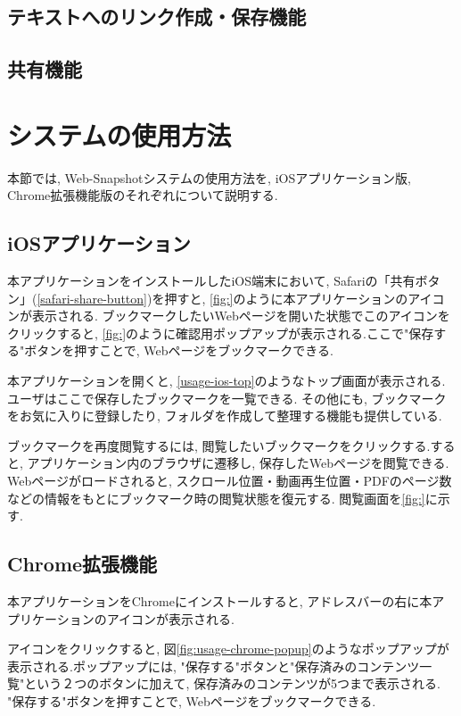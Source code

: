 \subsection{テキストへのリンク作成・保存機能}
\subsection{共有機能}

\section{システムの使用方法}
本節では, Web-Snapshotシステムの使用方法を, iOSアプリケーション版, Chrome拡張機能版のそれぞれについて説明する.

\subsection{iOSアプリケーション}
本アプリケーションをインストールしたiOS端末において, Safariの「共有ボタン」(\ref{safari-share-button})を押すと, \ref{fig:}のように本アプリケーションのアイコンが表示される.
ブックマークしたいWebページを開いた状態でこのアイコンをクリックすると, \ref{fig:}のように確認用ポップアップが表示される.ここで"保存する"ボタンを押すことで, Webページをブックマークできる.

本アプリケーションを開くと, \ref{usage-ios-top}のようなトップ画面が表示される.ユーザはここで保存したブックマークを一覧できる.
その他にも, ブックマークをお気に入りに登録したり, フォルダを作成して整理する機能も提供している.

ブックマークを再度閲覧するには, 閲覧したいブックマークをクリックする.すると, アプリケーション内のブラウザに遷移し, 保存したWebページを閲覧できる.
Webページがロードされると, スクロール位置・動画再生位置・PDFのページ数などの情報をもとにブックマーク時の閲覧状態を復元する.
閲覧画面を\ref{fig:}に示す.

\subsection{Chrome拡張機能}
本アプリケーションをChromeにインストールすると, アドレスバーの右に本アプリケーションのアイコンが表示される.

アイコンをクリックすると, 図\ref{fig:usage-chrome-popup}のようなポップアップが表示される.ポップアップには, "保存する"ボタンと"保存済みのコンテンツ一覧"という２つのボタンに加えて, 保存済みのコンテンツが5つまで表示される.
"保存する"ボタンを押すことで, Webページをブックマークできる.

